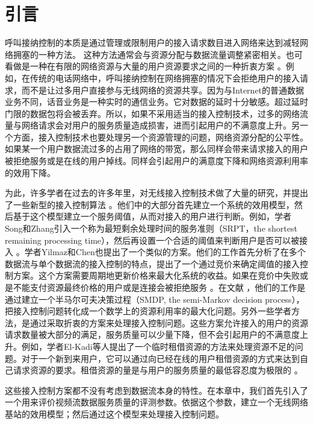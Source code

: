 \section{引言}
\label{section_cacop_introduction}
\par 呼叫接纳控制的本质是通过管理或限制用户的接入请求数目进入网络来达到减轻网络拥塞的一种方法。
这种方法通常会与资源分配与数据流量调整紧密相关。也可看做是一种在有限的网络资源与大量的用户资源要求之间的一种折衷方案\cite{Y-G-Fang.TVT.2002} \cite{Y-Xiao.IEICE.TC.2001}。例如，在传统的电话网络中，呼叫接纳控制在网络拥塞的情况下会拒绝用户的接入请求，而不是让过多用户直接参与无线网络的资源共享。因为与Internet的普通数据业务不同，话音业务是一种实时的通信业务。它对数据的延时十分敏感。超过延时门限的数据包将会被丢弃。所以，如果不采用适当的接入控制技术，过多的网络流量与网络请求会对用户的服务质量造成损害，进而引起用户的不满意度上升。另一个方面，接入控制技术也要处理另一个资源管理的问题，网络资源分配的公平性。如果某一个用户数据流过多的占用了网络的带宽，那么同样会带来请求接入的用户被拒绝服务或是在线的用户掉线。同样会引起用户的满意度下降和网络资源利用率的效用下降。
\par 为此，许多学者在过去的许多年里，对无线接入控制技术做了大量的研究，并提出了一些新型的接入控制算法\cite{Y-Qian.TWC.2006} \cite{G-Djuka.TELSIK.2007}。他们中的大部分首先建立一个系统的效用模型，然后基于这个模型建立一个服务阈值，从而对接入的用户进行判断。例如，学者Song和Zhang引入一个称为最短剩余处理时间的服务准则（SRPT，the shortest remaining processing time），然后再设置一个合适的阈值来判断用户是否可以被接入 \cite{Song2009}。学者Yilmaz和Chen也提出了一个类似的方案。他们的工作首先分析了在多个数据流与单个数据流的接入控制的特点，提出了一个通过竞价来确定阈值的接入控制方案。这个方案需要周期地更新价格来最大化系统的收益。如果在竞价中失败或是不能支付资源最终价格的用户或是连接会被拒绝服务 \cite{Yilmax2009}。在文献 \cite{Zhai2005,Ni2009}，他们的工作是通过建立一个半马尔可夫决策过程（SMDP, the semi-Markov decision process），把接入控制问题转化成一个数学上的资源利用率的最大化问题。另外一些学者方法，是通过采取折衷的方案来处理接入控制问题。这些方案允许接入的用户的资源请求数量被大部分的满足，服务质量可以少量下降，但不会引起用户的不满意度上升。例如，学者El-Kadi等人提出了一个临时租借资源的方法来处理资源不足的问题。对于一个新到来用户，它可以通过向已经在线的用户租借资源的方式来达到自己请求资源的要求。租借资源的量是与用户的服务质量的最低容忍度为极限的 \cite{EL-Kadi2002}。
\par 这些接入控制方案都不没有考虑到数据流本身的特性。在本章中，我们首先引入了一个用来评价视频流数据服务质量的评测参数。依据这个参数，建立一个无线网络基站的效用模型；然后通过这个模型来处理接入控制问题。

